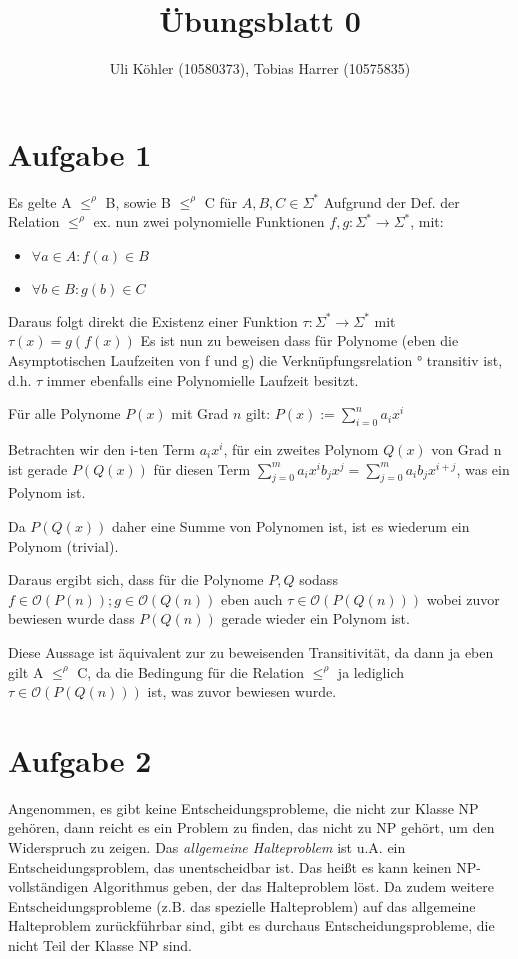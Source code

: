 \documentclass[a4paper,10pt,oneside,leqno]{scrartcl}
\title{Übungsblatt 0}
\author{Uli Köhler (10580373), Tobias Harrer (10575835)}
\begin{document}
\maketitle
\section*{Aufgabe 1}
Es gelte A $\leq^{\rho}$ B, sowie B $\leq^{\rho}$ C für $A,B,C \in \Sigma^*$
Aufgrund der Def. der Relation $\leq^{\rho}$ ex. nun zwei polynomielle Funktionen
$f, g : \Sigma^* \rightarrow \Sigma^*$, mit:
\begin{itemize}
 \item $\forall a \in A: f(a) \in B$
 \item $\forall b \in B: g(b) \in C$
\end{itemize}
Daraus folgt direkt die Existenz einer Funktion $\tau : \Sigma^* \rightarrow \Sigma^*$ mit $\tau(x) = g(f(x))$
Es ist nun zu beweisen dass für Polynome (eben die Asymptotischen Laufzeiten von f und g) die Verknüpfungsrelation ° transitiv ist,
d.h. $\tau$ immer ebenfalls eine Polynomielle Laufzeit besitzt.

Für alle Polynome $P(x)$ mit Grad $n$ gilt: $P(x) := \sum^n_{i=0}a_ix^i$

Betrachten wir den i-ten Term $a_ix^i$, für ein zweites Polynom $Q(x)$ von Grad n ist gerade
$P(Q(x))$ für diesen Term $\sum^m_{j=0}a_ix^ib_jx^j = \sum^m_{j=0}a_ib_jx^{i+j}$, was ein Polynom ist.

Da $P(Q(x))$ daher eine Summe von Polynomen ist, ist es wiederum ein Polynom (trivial).

Daraus ergibt sich, dass für die Polynome $P,Q$ sodass $f \in \mathcal{O}(P(n)) ; g \in \mathcal{O}(Q(n))$ eben auch
$\tau \in \mathcal{O}(P(Q(n)))$ wobei zuvor bewiesen wurde dass $P(Q(n))$ gerade wieder ein Polynom ist.

Diese Aussage ist äquivalent zur zu beweisenden Transitivität, da dann ja eben gilt A $\leq^{\rho}$ C,
da die Bedingung für die Relation $\leq^{\rho}$ ja lediglich  $\tau \in \mathcal{O}(P(Q(n)))$ ist, was zuvor bewiesen wurde.

\section*{Aufgabe 2}
Angenommen, es gibt keine Entscheidungsprobleme, die nicht zur Klasse NP gehören, dann reicht es ein Problem zu finden, das nicht zu NP gehört, um den Widerspruch zu zeigen.
Das \textit{allgemeine Halteproblem} ist u.A. ein Entscheidungsproblem, das unentscheidbar ist. Das heißt es kann keinen NP-vollständigen Algorithmus geben, der das Halteproblem löst.
Da zudem weitere Entscheidungsprobleme (z.B. das spezielle Halteproblem) auf das allgemeine Halteproblem zurückführbar sind, gibt es durchaus Entscheidungsprobleme, die nicht Teil der
Klasse NP sind.
\end{document}
